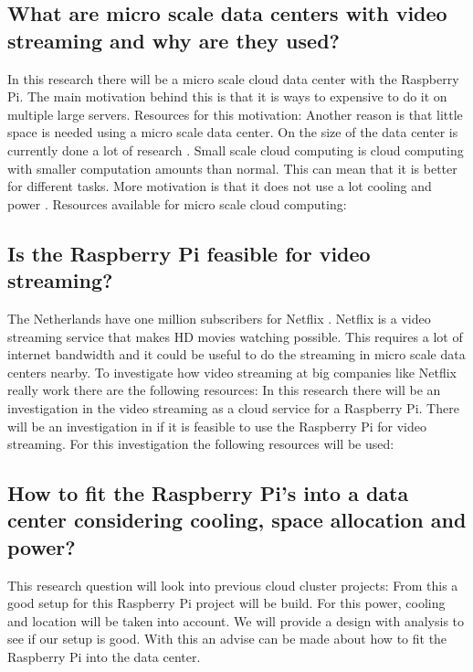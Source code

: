 \documentclass{sig-alternate-br}
\begin{document}
\subsection{What are micro scale data centers with video streaming and why are they used?}
In this research there will be a micro scale cloud data center with the Raspberry Pi. The main motivation behind this is that it is ways to expensive to do it on multiple large servers. Resources for this motivation:
\cite{southampton, Powerusage, cox:2014} \newline
Another reason is that little space is needed using a micro scale data center. On the size of the data center is currently done a lot of research \cite{Pcextreme}. \newline
Small scale cloud computing is cloud computing with smaller computation amounts than normal. This can mean that it is better for different tasks. More motivation is that it does not use a lot cooling and power \cite{tso:2013}. Resources available for micro scale cloud computing:
\cite{Pcextreme,armbrust:2009,richardson:2012,abrahamsson:2013,southampton, tso:2013, beloglazov:2010, qian:2009, hofer:2011, drago2012inside, dropbox, owncloud, Miettinen:2010:EEM:1863103.1863107, beloglazov2012energy,cox:2014} 
 
\subsection{Is the Raspberry Pi feasible for video streaming?}
The Netherlands have one million subscribers for Netflix \cite{volkskrant}. Netflix is a video streaming service that makes HD movies watching possible. This requires a lot of internet bandwidth and it could be useful to do the streaming in micro scale data centers nearby. To investigate how video streaming at big companies like Netflix really  work there are the following resources:
\cite{volkskrant, Adhikari:2012} \newline
In this research there will be an investigation in the video streaming as a cloud service for a Raspberry Pi. There will be an investigation in if it is feasible to use the Raspberry Pi for video streaming. For this investigation the following resources will be used:
\cite{raspberry-video,video-1080p, plissonneau:2012, computer-networking}

\subsection{How to fit the Raspberry Pi's into a data center considering cooling, space allocation and power?}
This research question will look into previous cloud cluster projects: 
\cite{abrahamsson:2013,southampton, tso:2013, beloglazov:2010,cox:2014} \newline
From this a good setup for this Raspberry Pi project will be build. For this power, cooling and location will be taken into account. We will provide a design with analysis to see if our setup is good. With this an advise can be made about how to fit the Raspberry Pi into the data center.
\end{document}
